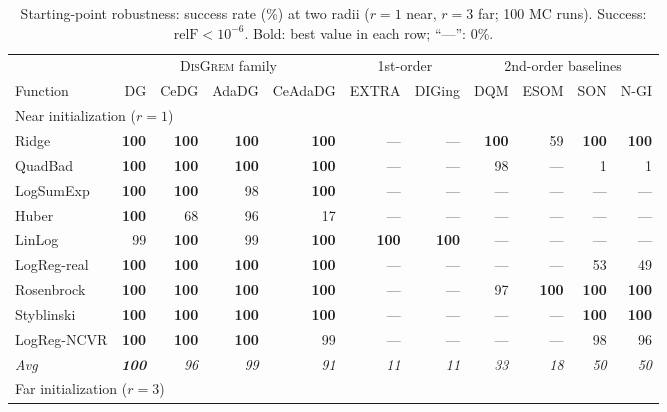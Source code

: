 \documentclass[review,onefignum,onetabnum]{siamart171218}
\begin{document}
	\begin{table}[htbp]
		\centering
		\caption{Starting-point robustness: success rate (\%)
			at two radii ($r{=}1$ near, $r{=}3$ far; 100 MC runs).
			Success: $\mathrm{relF}<10^{-6}$.
			Bold: best value in each row; ``---'': 0\%.}
		\label{tab:robust}
		\setlength{\tabcolsep}{3pt}
		\footnotesize
		\begin{tabular}{l rrrr rr rrrr}
			\toprule
			& \multicolumn{4}{c}{\textsc{DisGrem} family}
			& \multicolumn{2}{c}{1st-order}
			& \multicolumn{4}{c}{2nd-order baselines} \\
			\cmidrule(lr){2-5}\cmidrule(lr){6-7}\cmidrule(lr){8-11}
			Function & DG & CeDG & AdaDG & CeAdaDG
			& EXTRA & DIGing & DQM & ESOM & SON & N-GI \\
			\midrule
			\multicolumn{11}{l}{Near initialization ($r{=}1$)} \\
			\midrule
			Ridge       & \textbf{100} & \textbf{100} & \textbf{100} & \textbf{100} & --- & --- & \textbf{100} & 59 & \textbf{100} & \textbf{100} \\
			QuadBad     & \textbf{100} & \textbf{100} & \textbf{100} & \textbf{100} & --- & --- & 98 & --- & 1 & 1 \\
			LogSumExp   & \textbf{100} & \textbf{100} & 98 & \textbf{100} & --- & --- & --- & --- & --- & --- \\
			Huber       & \textbf{100} & 68 & 96 & 17 & --- & --- & --- & --- & --- & --- \\
			LinLog      & 99 & \textbf{100} & 99 & \textbf{100} & \textbf{100} & \textbf{100} & --- & --- & --- & --- \\
			LogReg-real & \textbf{100} & \textbf{100} & \textbf{100} & \textbf{100} & --- & --- & --- & --- & 53 & 49 \\
			Rosenbrock  & \textbf{100} & \textbf{100} & \textbf{100} & \textbf{100} & --- & --- & 97 & \textbf{100} & \textbf{100} & \textbf{100} \\
			Styblinski  & \textbf{100} & \textbf{100} & \textbf{100} & \textbf{100} & --- & --- & --- & --- & \textbf{100} & \textbf{100} \\
			LogReg-NCVR & \textbf{100} & \textbf{100} & \textbf{100} & 99 & --- & --- & --- & --- & 98 & 96 \\
			\textit{Avg} & \textbf{\textit{100}} & \textit{96} & \textit{99} & \textit{91}
			& \textit{11} & \textit{11} & \textit{33} & \textit{18}
			& \textit{50} & \textit{50} \\
			\midrule
			\multicolumn{11}{l}{Far initialization ($r{=}3$)} \\

\end{tabular}
\end{table}
\end{document}
